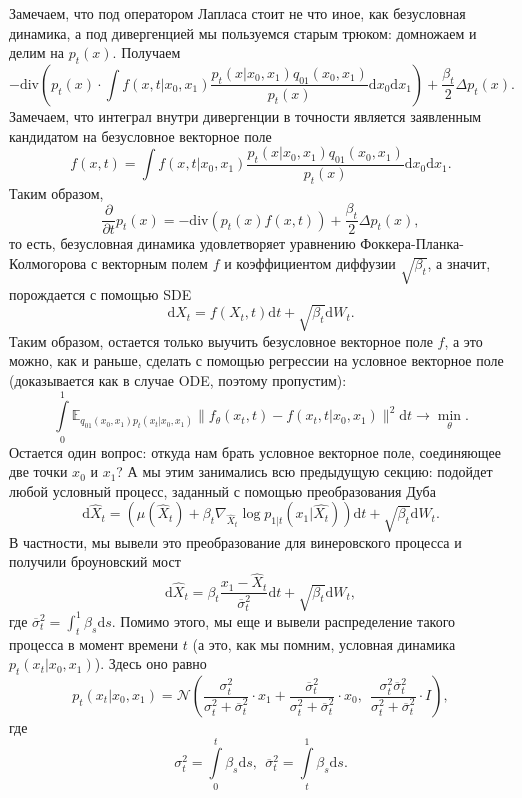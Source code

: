 \documentclass[12pt]{article}
\theoremstyle{definition}
\begin{document}
Замечаем, что под оператором Лапласа стоит не что иное, как безусловная динамика, а под дивергенцией мы пользуемся старым трюком: домножаем и делим на $p_t(x)$. Получаем
\[
    - \text{div}\left(p_t(x) \cdot \int f(x, t |x_0, x_1) \frac{p_t(x | x_0, x_1)q_{01}(x_0, x_1)}{p_t(x)} \mathrm{d} x_0 \mathrm{d} x_1 \right) + \frac{\beta_t}{2} \Delta p_t(x).
\]
Замечаем, что интеграл внутри дивергенции в точности является заявленным кандидатом на безусловное векторное поле
\[
    f(x, t) = \int f(x, t | x_0, x_1)\frac{p_t(x | x_0, x_1)q_{01}(x_0, x_1)}{p_t(x)} \mathrm{d}x_0 \mathrm{d} x_1.
\]
Таким образом,
\[
    \frac{\partial}{\partial t} p_t(x) = -\text{div}\left(p_t(x) f(x, t)\right) + \frac{\beta_t}{2} \Delta p_t(x),
\]
то есть, безусловная динамика удовлетворяет уравнению Фоккера-Планка-Колмогорова с векторным полем $f$ и коэффициентом диффузии $\sqrt{\beta_t}$, а значит, порождается с помощью SDE
\[
    \mathrm{d} X_t = f(X_t, t) \mathrm{d} t + \sqrt{\beta_t} \mathrm{d} W_t.
\]
Таким образом, остается только выучить безусловное векторное поле $f$, а это можно, как и раньше, сделать с помощью регрессии на условное векторное поле (доказывается как в случае ODE, поэтому пропустим):
\[
    \int\limits_{0}^{1} \mathbb{E}_{q_{01}(x_0, x_1)p_t(x_t | x_0, x_1)} \| f_\theta(x_t, t) - f(x_t, t | x_0, x_1) \|^2 \mathrm{d} t \rightarrow \min\limits_{\theta}.
\]
Остается один вопрос: откуда нам брать условное векторное поле, соединяющее две точки $x_0$ и $x_1$? А мы этим занимались всю предыдущую секцию: подойдет любой условный процесс, заданный с помощью преобразования Дуба
\[
    \mathrm{d} \hat{X}_t =\left(\mu(\hat{X}_t) + \beta_t \nabla_{\hat{X}_t} \log p_{1 | t}(x_1 | \hat{X_t}) \right)\mathrm{d} t + \sqrt{\beta_t} \mathrm{d} W_t.
\]
В частности, мы вывели это преобразование для винеровского процесса и получили броуновский мост
\[
    \mathrm{d} \hat{X}_t = \beta_t \frac{x_1 - \hat{X}_t}{\overline{\sigma}^2_t} \mathrm{d} t + \sqrt{\beta_t}\mathrm{d} W_t,
\]
где $\overline{\sigma}^2_t = \int_t^{1}\beta_s \mathrm{d} s$. Помимо этого, мы еще и вывели распределение такого процесса в момент времени $t$ (а это, как мы помним, условная динамика $p_t(x_t | x_0, x_1)$). Здесь оно равно
\[
    p_t(x_t | x_0, x_1) = \mathcal{N}\left(\frac{\sigma^2_t}{\sigma^2_t + \overline{\sigma}^2_t} \cdot x_1 + \frac{\overline{\sigma}^2_t}{\sigma^2_t + \overline{\sigma}^2_t} \cdot x_0, \:\: \frac{\sigma^2_t \overline{\sigma}^2_t}{\sigma^2_t + \overline{\sigma}^2_t} \cdot I  \right),
\]
где
\[
    \sigma^2_t = \int \limits_{0}^{t} \beta_s \mathrm{d} s, \:\: \overline{\sigma}^2_t = \int \limits_{t}^{1} \beta_s \mathrm{d} s.
\]
\end{document}
